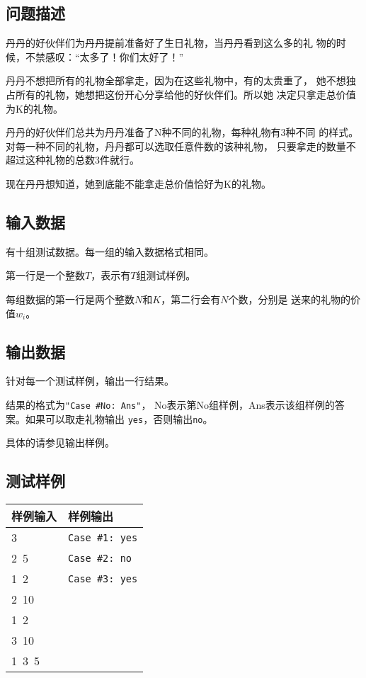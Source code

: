 \documentclass{article}
\begin{document}
\subsection*{问题描述}
丹丹的好伙伴们为丹丹提前准备好了生日礼物，当丹丹看到这么多的礼
物的时候，不禁感叹：“太多了！你们太好了！”

丹丹不想把所有的礼物全部拿走，因为在这些礼物中，有的太贵重了，
她不想独占所有的礼物，她想把这份开心分享给他的好伙伴们。所以她
决定只拿走总价值为K的礼物。

丹丹的好伙伴们总共为丹丹准备了N种不同的礼物，每种礼物有3种不同
的样式。对每一种不同的礼物，丹丹都可以选取任意件数的该种礼物，
只要拿走的数量不超过这种礼物的总数3件就行。

现在丹丹想知道，她到底能不能拿走总价值恰好为K的礼物。

\subsection*{输入数据}
有十组测试数据。每一组的输入数据格式相同。

第一行是一个整数$T$，表示有$T$组测试样例。

每组数据的第一行是两个整数$N$和$K$，第二行会有$N$个数，分别是
送来的礼物的价值$w_i$。

\subsection*{输出数据}
针对每一个测试样例，输出一行结果。

结果的格式为{\tt "Case \#No: Ans"}，
No表示第No组样例，Ans表示该组样例的答案。如果可以取走礼物输出
{\tt yes}，否则输出{\tt no}。

具体的请参见输出样例。

\subsection*{测试样例}
\begin{flushleft}
\begin{tabular}{|p{6cm}|p{6cm}|}
 \hline \bfseries{样例输入} & \bfseries{样例输出} \\
 \hline 
    3 & {\tt Case \#1: yes} \\
    2\ 5 & {\tt Case \#2: no} \\
    1\ 2 & {\tt Case \#3: yes} \\
    2\ 10 & \\
    1\ 2 & \\
    3\ 10 & \\
    1\ 3\ 5 & \\
 \hline 
\end{tabular}
\end{flushleft}
\end{document}

